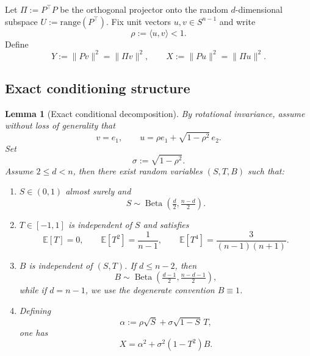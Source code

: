 \documentclass{article}
\DeclareMathOperator{\BetaDist}{Beta}
\newtheorem{lemma}{Lemma}
\begin{document}
Let $\Pi:=P^\top P$ be the orthogonal projector onto the random $d$-dimensional subspace $U:=\mathrm{range}(P^\top)$.
Fix unit vectors $u,v\in S^{n-1}$ and write
\begin{equation}
\rho:=\langle u,v\rangle <1.
\label{eq:def_rho_c}
\end{equation}
Define
\begin{equation}
Y:=\|Pv\|^2=\|\Pi v\|^2,
\qquad
X:=\|Pu\|^2=\|\Pi u\|^2.
\label{eq:def_Y_X}
\end{equation}




\subsection{Exact conditioning structure}

\begin{lemma}[Exact conditional decomposition]
\label{lem:cond_decomp}
By rotational invariance, assume without loss of generality that
\begin{equation}
v=e_1,
\qquad
u=\rho e_1+\sqrt{1-\rho^2}\,e_2.
\label{eq:wlog_basis}
\end{equation}
Set
\[
\sigma:=\sqrt{1-\rho^2}.
\]
Assume \(2\le d<n\), then there exist random variables $(S,T,B)$ such that:
\begin{enumerate}
\item $S\in(0,1)$ almost surely and
\begin{equation}
S\sim \BetaDist\!\left(\tfrac d2,\tfrac{n-d}{2}\right).
\label{eq:S_beta}
\end{equation}
\item $T\in[-1,1]$ is independent of $S$ and satisfies
\begin{equation}
\mathbb E[T]=0,
\qquad
\mathbb E[T^2]=\frac{1}{n-1},
\qquad
\mathbb E[T^4]=\frac{3}{(n-1)(n+1)}.
\label{eq:T_moments}
\end{equation}
\item \(B\) is independent of \((S,T)\). If \(d\le n-2\), then
\[
B\sim \BetaDist\!\left(\tfrac{d-1}{2},\tfrac{n-d-1}{2}\right),
\]
while if \(d=n-1\), we use the degenerate convention \(B\equiv1\).
\item Defining
\begin{equation}
\alpha:=\rho\sqrt S+\sigma\sqrt{1-S}\,T,
\label{eq:def_alpha}
\end{equation}
one has
\begin{equation}
X=\alpha^2+\sigma^2(1-T^2)B.
\label{eq:X_decomp}
\end{equation}
\end{enumerate}
\end{lemma}
\end{document}
